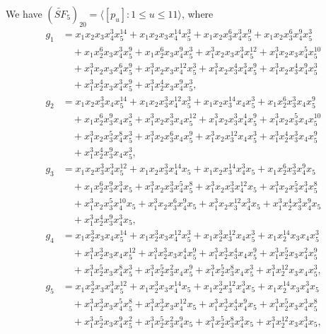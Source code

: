 \documentclass[reqno]{amsart}
\theoremstyle{plain}
\theoremstyle{definition}
\theoremstyle{plain}
\theoremstyle{definition}
\numberwithin{equation}{section}
\begin{document}
\smallskip
We have $(\widetilde{SF}_5)_{20} = \langle [p_u]: 1 \leqslant u \leqslant 11\rangle$, where
\begin{align*}
g_1 &= x_1x_2x_3x_4^{3}x_5^{14} + x_1x_2x_3x_4^{14}x_5^{3} + x_1x_2x_3^{6}x_4^{3}x_5^{9} + x_1x_2x_3^{6}x_4^{9}x_5^{3}\\ &\quad + x_1x_2^{6}x_3x_4^{3}x_5^{9} + x_1x_2^{6}x_3x_4^{9}x_5^{3} + x_1^{3}x_2x_3x_4^{3}x_5^{12} + x_1^{3}x_2x_3x_4^{5}x_5^{10}\\ &\quad + x_1^{3}x_2x_3x_4^{6}x_5^{9} + x_1^{3}x_2x_3x_4^{12}x_5^{3} + x_1^{3}x_2x_3^{4}x_4^{3}x_5^{9} + x_1^{3}x_2x_3^{4}x_4^{9}x_5^{3}\\ &\quad + x_1^{3}x_2^{4}x_3x_4^{3}x_5^{9} + x_1^{3}x_2^{4}x_3x_4^{9}x_5^{3},\\
g_2 &= x_1x_2x_3^{3}x_4x_5^{14} + x_1x_2x_3^{3}x_4^{12}x_5^{3} + x_1x_2x_3^{14}x_4x_5^{3} + x_1x_2^{6}x_3^{3}x_4x_5^{9}\\ &\quad + x_1x_2^{6}x_3^{9}x_4x_5^{3} + x_1^{3}x_2x_3^{3}x_4x_5^{12} + x_1^{3}x_2x_3^{3}x_4^{4}x_5^{9} + x_1^{3}x_2x_3^{5}x_4x_5^{10}\\ &\quad + x_1^{3}x_2x_3^{5}x_4^{8}x_5^{3} + x_1^{3}x_2x_3^{6}x_4x_5^{9} + x_1^{3}x_2x_3^{12}x_4x_5^{3} + x_1^{3}x_2^{4}x_3^{3}x_4x_5^{9}\\ &\quad + x_1^{3}x_2^{4}x_3^{9}x_4x_5^{3},\\
g_3 & = x_1x_2x_3^{3}x_4^{3}x_5^{12} + x_1x_2x_3^{3}x_4^{14}x_5 + x_1x_2x_3^{14}x_4^{3}x_5 + x_1x_2^{6}x_3^{3}x_4^{9}x_5\\ &\quad + x_1x_2^{6}x_3^{9}x_4^{3}x_5 + x_1^{3}x_2x_3^{3}x_4^{5}x_5^{8} + x_1^{3}x_2x_3^{3}x_4^{12}x_5 + x_1^{3}x_2x_3^{5}x_4^{3}x_5^{8}\\ &\quad + x_1^{3}x_2x_3^{5}x_4^{10}x_5 + x_1^{3}x_2x_3^{6}x_4^{9}x_5 + x_1^{3}x_2x_3^{12}x_4^{3}x_5 + x_1^{3}x_2^{4}x_3^{3}x_4^{9}x_5\\ &\quad + x_1^{3}x_2^{4}x_3^{9}x_4^{3}x_5,\\
g_4 &= x_1x_2^{3}x_3x_4x_5^{14} + x_1x_2^{3}x_3x_4^{12}x_5^{3} + x_1x_2^{3}x_3^{12}x_4x_5^{3} + x_1x_2^{14}x_3x_4x_5^{3}\\ &\quad + x_1^{3}x_2^{3}x_3x_4x_5^{12} + x_1^{3}x_2^{3}x_3x_4^{4}x_5^{9} + x_1^{3}x_2^{3}x_3^{4}x_4x_5^{9} + x_1^{3}x_2^{5}x_3x_4^{2}x_5^{9}\\ &\quad + x_1^{3}x_2^{5}x_3x_4^{8}x_5^{3} + x_1^{3}x_2^{5}x_3^{2}x_4x_5^{9} + x_1^{3}x_2^{5}x_3^{8}x_4x_5^{3} + x_1^{3}x_2^{12}x_3x_4x_5^{3},\\
g_5 &= x_1x_2^{3}x_3x_4^{3}x_5^{12} + x_1x_2^{3}x_3x_4^{14}x_5 + x_1x_2^{3}x_3^{12}x_4^{3}x_5 + x_1x_2^{14}x_3x_4^{3}x_5\\ &\quad + x_1^{3}x_2^{3}x_3x_4^{5}x_5^{8} + x_1^{3}x_2^{3}x_3x_4^{12}x_5 + x_1^{3}x_2^{3}x_3^{4}x_4^{9}x_5 + x_1^{3}x_2^{5}x_3x_4^{3}x_5^{8}\\ &\quad + x_1^{3}x_2^{5}x_3x_4^{9}x_5^{2} + x_1^{3}x_2^{5}x_3^{2}x_4^{9}x_5 + x_1^{3}x_2^{5}x_3^{8}x_4^{3}x_5 + x_1^{3}x_2^{12}x_3x_4^{3}x_5,\\

\end{align*}
\end{document}
